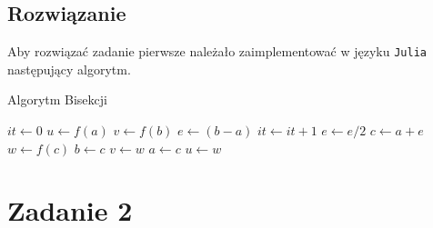 \documentclass{article}
\begin{document}
\begin{center}
    \subsection{Rozwiązanie}
    \large Aby rozwiązać zadanie pierwsze należało zaimplementować w języku \texttt{Julia} następujący algorytm. 
    \begin{flushleft}
        \begin{algorithm}
            \caption{Algorytm Bisekcji}\label{alg:bisekcji}
            \begin{algorithmic}
                \State$it \gets 0$
                \State$u \gets f(a)$
                \State$v \gets f(b)$
                \State$e \gets (b - a)$
                \EndIf
                    \State$it \gets it + 1$
                    \State$e \gets e/2$
                    \State$c \gets a + e$
                    \State$w \gets f(c)$
                    \EndIf
                        \State$b \gets c$
                        \State$v \gets w$
                    \Else
                        \State$a \gets c$
                        \State$u \gets w$
                    \EndIf
                \EndWhile
                \EndFunction
            \end{algorithmic}
        \end{algorithm}
    \end{flushleft}

    \section{Zadanie 2}

\end{center}
\end{document}
